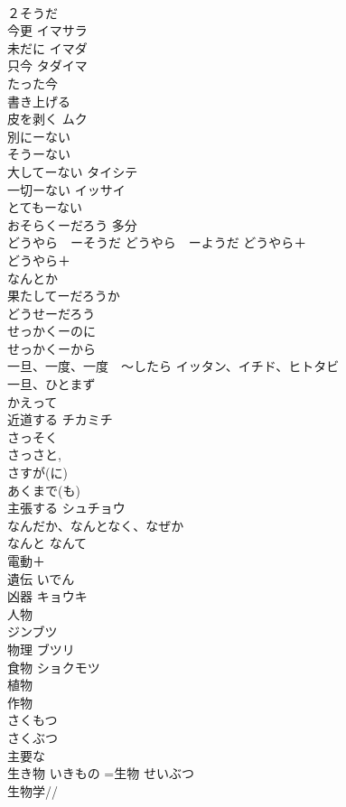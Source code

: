 \documentclass[8pt]{extreport}
\begin{document}
\begin{CJK}{UTF8}{min}
\\	２そうだ	
\\	今更	イマサラ 
\\	未だに	イマダ 
\\	只今	タダイマ 
\\	たった今	
\\	書き上げる	
\\	皮を剥く	ムク 
\\	別にーない	
\\	そうーない	
\\	大してーない	タイシテ 
\\	一切ーない	イッサイ 
\\	とてもーない	
\\	おそらくーだろう	多分 
\\	どうやら　ーそうだ どうやら　ーようだ どうやら＋
\\	どうやら＋
\\	なんとか
\\	果たしてーだろうか	
\\	どうせーだろう	
\\	せっかくーのに	
\\	せっかくーから	
\\	一旦、一度、一度　〜したら	イッタン、イチド、ヒトタビ 
\\	一旦、ひとまず	
\\	かえって	
\\	近道する	チカミチ 
\\	さっそく	
\\	さっさと, 
\\	さすが(に)	
\\	あくまで(も)	
\\	主張する	シュチョウ 
\\	なんだか、なんとなく、なぜか	
\\	なんと なんて	
\\	電動＋
\\	遺伝	いでん 
\\	凶器	キョウキ 
\\	人物	
\\	ジンブツ
\\	物理	ブツリ 
\\	食物	ショクモツ 
\\	植物
\\	作物 
\\	さくもつ 
\\	さくぶつ 
\\	主要な	
\\	生き物	いきもの =生物 せいぶつ 
\\	生物学//

\end{CJK}
\end{document}
